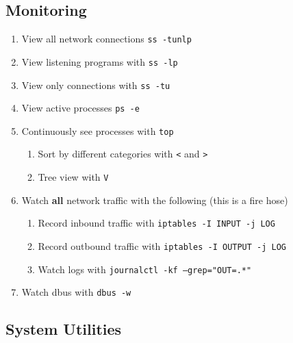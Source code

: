 \documentclass[12pt,letterpaper]{article}
\def\code#1{\textcolor{iris}{\texttt{#1}}}
\def\bf#1{\textbf{#1}}
\begin{document}
\subsection{Monitoring}

\begin{enumerate}
	\item View all network connections \code{ss -tunlp}
	\item View listening programs with \code{ss -lp}
	\item View only connections with \code{ss -tu}
	\item View active processes \code{ps -e}
	\item Continuously see processes with \code{top}
		\begin{enumerate}
			\item Sort by different categories with \code{<} and \code{>}
			\item Tree view with \code{V}
		\end{enumerate}
	\item Watch \bf{all} network traffic with the following (this is a fire hose)
		\begin{enumerate}
			\item Record inbound traffic with \code{iptables -I INPUT -j LOG}
			\item Record outbound traffic with \code{iptables -I OUTPUT -j LOG}
			\item Watch logs with \code{journalctl -kf --grep="OUT=.*"}
		\end{enumerate}
	\item Watch dbus with \code{dbus -w}
\end{enumerate}

\subsection{System Utilities}
\end{document}
